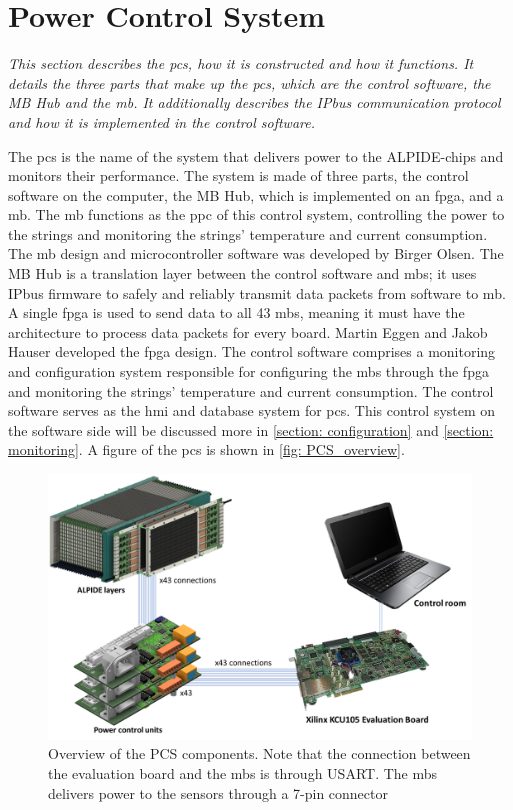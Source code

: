 \documentclass[main.tex]{subfiles}
\begin{document}
\section{Power Control System}
\label{section: pcs}
\textit{This section describes the \acrlong{pcs}, how it is constructed and how it functions. It details the three parts that make up the \gls{pcs}, which are the control software, the MB Hub and the \gls{mb}. It additionally describes the IPbus communication protocol and how it is implemented in the control software.}

The \gls{pcs} is the name of the system that delivers power to the ALPIDE-chips and monitors their performance. The system is made of three parts, the control software on the computer, the MB Hub, which is implemented on an \gls{fpga}, and a \acrlong{mb}. The \gls{mb} functions as the \gls{ppc} of this control system, controlling the power to the strings and monitoring the strings' temperature and current consumption. The \gls{mb} design and microcontroller software was developed by Birger Olsen. The MB Hub is a translation layer between the control software and \gls{mb}s; it uses IPbus firmware to safely and reliably transmit data packets from software to \gls{mb}. A single \gls{fpga} is used to send data to all 43 \gls{mb}s, meaning it must have the architecture to process data packets for every board. Martin Eggen and Jakob Hauser developed the \gls{fpga} design. The control software comprises a monitoring and configuration system responsible for configuring the \gls{mb}s through the \gls{fpga} and monitoring the strings' temperature and current consumption. The control software serves as the \gls{hmi} and database system for \gls{pcs}. This control system on the software side will be discussed more in \autoref{section: configuration} and \autoref{section: monitoring}. A figure of the \gls{pcs} is shown in \autoref{fig: PCS_overview}.

\begin{figure}[!htpb]
    \centering
    \includegraphics[width=15cm]{images/PowerDeliverySystemOverview.png}
    \caption{Overview of the PCS components. Note that the connection between the evaluation board and the \gls{mb}s is through USART. The \gls{mb}s delivers power to the sensors through a 7-pin connector\cite{gutta}}
    \label{fig: PCS_overview}
\end{figure}
\FloatBarrier
\end{document}
